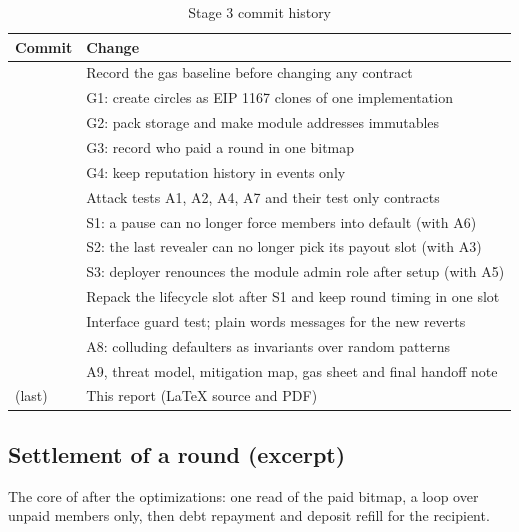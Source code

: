 \begin{table}[H]
\centering\small
\caption{Stage 3 commit history}
\label{tab:commits}
\begin{tabularx}{\textwidth}{@{}P{1.6cm}L@{}}
\toprule
Commit & Change \\
\midrule
{} & Record the gas baseline before changing any contract \\
 & G1: create circles as EIP 1167 clones of one implementation \\
 & G2: pack storage and make module addresses immutables \\
 & G3: record who paid a round in one bitmap \\
 & G4: keep reputation history in events only \\
 & Attack tests A1, A2, A4, A7 and their test only contracts \\
 & S1: a pause can no longer force members into default (with A6) \\
 & S2: the last revealer can no longer pick its payout slot (with A3) \\
 & S3: deployer renounces the module admin role after setup (with A5) \\
 & Repack the lifecycle slot after S1 and keep round timing in one slot \\
 & Interface guard test; plain words messages for the new reverts \\
 & A8: colluding defaulters as invariants over random patterns \\
 & A9, threat model, mitigation map, gas sheet and final handoff note \\
(last) & This report (LaTeX source and PDF) \\
\bottomrule
\end{tabularx}
\end{table}

\subsection{Settlement of a round (excerpt)}
The core of  after the optimizations: one read of the paid bitmap, a loop over
unpaid members only, then debt repayment and deposit refill for the recipient.

